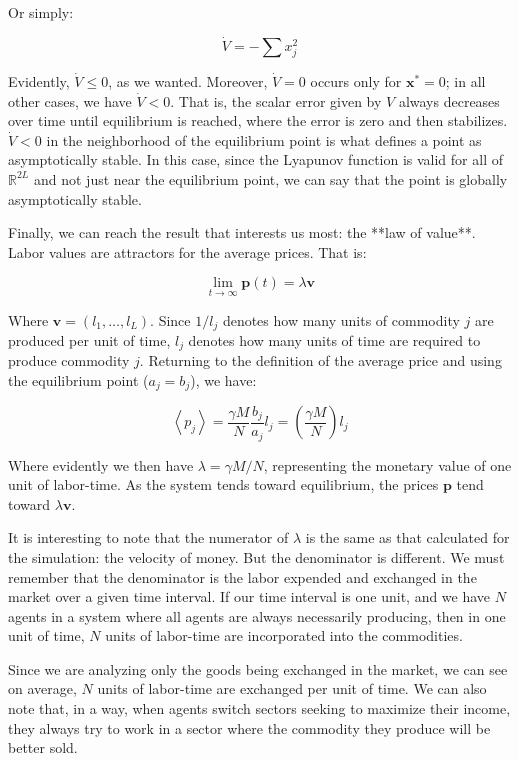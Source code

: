 Or simply:


$$
\dot{V}=-\sum x_{j}^{2}
$$

Evidently, $\dot{V}\leq0$, as we wanted. Moreover, $\dot{V}=0$ occurs only for $\boldsymbol{x}^{*}=0$; in all other cases, we have $\dot{V}< 0$. That is, the scalar error given by $V$ always decreases over time until equilibrium is reached, where the error is zero and then stabilizes. $\dot{V}< 0$ in the neighborhood of the equilibrium point is what defines a point as asymptotically stable. In this case, since the Lyapunov function is valid for all of $\mathbb{R}^{2L}$ and not just near the equilibrium point, we can say that the point is globally asymptotically stable.

Finally, we can reach the result that interests us most: the **law of value**.  Labor values are attractors for the average prices. That is:


$$\lim_{t\rightarrow\infty}\boldsymbol{p}\left(t\right)=\lambda\boldsymbol{v}$$

Where $\boldsymbol{v}=\left(l_{1},\dots,l_{L}\right)$. Since $1/l_{j}$ denotes how many units of commodity $j$ are produced per unit of time, $l_{j}$ denotes how many units of time are required to produce commodity $j$. Returning to the definition of the average price and using the equilibrium point ($a_{j}=b_{j}$), we have:


$$
\left\langle p_{j}\right\rangle =\frac{\gamma M}{N}\frac{b_{j}}{a_{j}}l_{j}=\left(\frac{\gamma M}{N}\right)l_{j}
$$

Where evidently we then have $\lambda=\gamma M/N$, representing the monetary value of one unit of labor-time. As the system tends toward equilibrium, the prices $\boldsymbol{p}$ tend toward $\lambda\boldsymbol{v}$.

It is interesting to note that the numerator of $\lambda$ is the same as that calculated for the simulation: the velocity of money. But the denominator is different. We must remember that the denominator is the labor expended and exchanged in the market over a given time interval. If our time interval is one unit, and we have $N$ agents in a system where all agents are always necessarily producing, then in one unit of time, $N$ units of labor-time are incorporated into the commodities.

Since we are analyzing only the goods being exchanged in the market, we can see on average, $N$ units of labor-time are exchanged per unit of time. We can also note that, in a way, when agents switch sectors seeking to maximize their income, they always try to work in a sector where the commodity they produce will be better sold.


